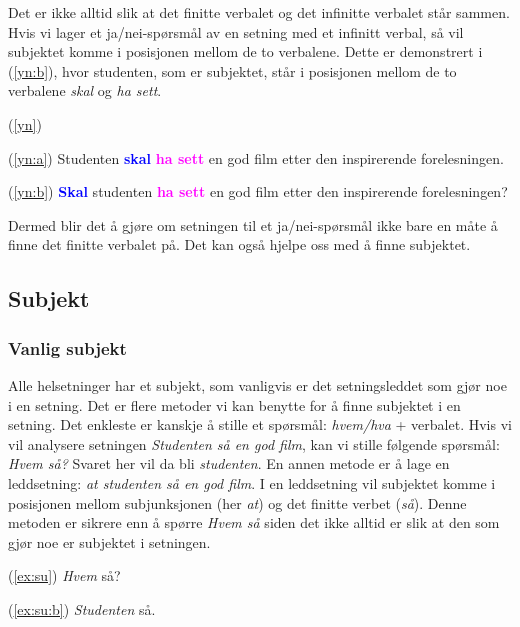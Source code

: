 \documentclass{article}
\begin{document}
Det er ikke alltid slik at det finitte verbalet og det infinitte verbalet st{\aa}r sammen. Hvis vi lager et ja/nei-sp{\o}rsm{\aa}l av en setning med et infinitt verbal, s{\aa} vil subjektet komme i posisjonen mellom de to verbalene. Dette er demonstrert i (\ref{yn:b}), hvor studenten, som er subjektet, st{\aa}r i posisjonen mellom de to verbalene {\it skal} og {\it ha sett}.

\begin{exe}
\ex\label{yn} (\ref{yn})
\begin{xlist}
\ex\label{yn:a} (\ref{yn:a}) Studenten \textcolor{blue}{\bf skal} \textcolor{magenta}{\bf ha sett} en god film etter den inspirerende forelesningen.

\ex\label{yn:b} (\ref{yn:b}) \textcolor{blue}{\bf Skal} studenten \textcolor{magenta}{\bf ha sett} en god film etter den inspirerende forelesningen?
\end{xlist}
\end{exe}

Dermed blir det {\aa} gj{\o}re om setningen til et ja/nei-sp{\o}rsm{\aa}l ikke bare en m{\aa}te {\aa} finne det finitte verbalet p{\aa}. Det kan ogs{\aa} hjelpe oss med {\aa} finne subjektet.

\subsection{Subjekt}

\subsubsection{Vanlig subjekt}

Alle helsetninger har et subjekt, som vanligvis er det setningsleddet som gj{\o}r noe i en setning. Det er flere metoder vi kan benytte for {\aa} finne subjektet i en setning. Det enkleste er kanskje {\aa} stille et sp{\o}rsm{\aa}l: {\it hvem/hva} + verbalet. Hvis vi vil analysere setningen {\it Studenten s{\aa} en god film}, kan vi stille f{\o}lgende sp{\o}rsm{\aa}l: {\it Hvem s{\aa}?} Svaret her vil da bli {\it studenten}. En annen metode er {\aa} lage en leddsetning: {\it at studenten s{\aa} en god film}. I en leddsetning vil subjektet komme i posisjonen mellom subjunksjonen (her {\it at}) og det finitte verbet ({\it s{\aa}}). Denne metoden er sikrere enn {\aa} sp{\o}rre {\it Hvem s{\aa}} siden det ikke alltid er slik at den som gj{\o}r noe er subjektet i setningen. 

\begin{exe}
\ex
\begin{xlist}
\ex\label{ex:su} (\ref{ex:su}) {\it Hvem} s{\aa}?

\ex\label{ex:su:b} (\ref{ex:su:b}) {\it Studenten} s{\aa}.
\end{xlist}
\end{exe}
\end{document}
